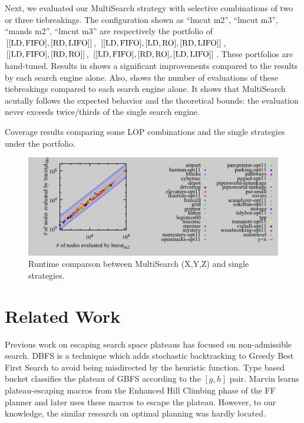 Next, we evaluated our MultiSearch
strategy with selective combinations of two or three tiebreakings.
The configuration shown as ``lmcut m2'', ``lmcut m3'', ``mands m2'',
``lmcut m3'' are respectively the portfolio of
$[[\mbox{LD},\mbox{FIFO}], [\mbox{RD},\mbox{LIFO}]]$, $[[\mbox{LD},\mbox{FIFO}], [\mbox{LD},\mbox{RO}], [\mbox{RD},\mbox{LIFO}]]$,
$[[\mbox{LD},\mbox{FIFO}],[\mbox{RD},\mbox{RO}]]$, $[[\mbox{LD},\mbox{FIFO}],[\mbox{RD},\mbox{RO}],[\mbox{LD},\mbox{LIFO}]]$. These
portfolios are hand-tuned.
Results in 
shows a significant improvements compared to the results by each search
engine alone.
% 
Also,  shows the number of evaluations of these
tiebreakings compared to each search engine alone.  It shows that
MultiSearch acutally follows the expected behavior and the theoretical
bounds: the evaluation never exceeds twice/thirds of the single
search engine.

\begin{table}[htb]
 \centering {}
 
 \caption{Coverage results comparing some LOP combinations and the
 single strategies under the portfolio. }
 \label{portfolio-coverage}
\end{table}

\begin{figure}[htb]
 \centering
 \includegraphics{tables/aaai16-5min/aaai16prelim3/evaluated-lmcut_m2-lmcut_ld_fifo.pdf}
 \caption{Runtime comparson between MultiSearch (X,Y,Z) and single strategies.}
 \label{portfolio-runtime}
\end{figure}


\section{Related Work}
\label{sec-4}

Previous work on escaping search space plateaus has focused on non-admissible search.
DBFS \cite{imai2011novel} is a technique which adds stochastic
backtracking to Greedy Best First Search to avoid being misdirected by the
heuristic function. Type based bucket \cite{xie14type} 
classifies the plateau of GBFS according to the $[g,h]$ pair.
Marvin \cite{Coles07} learns plateau-escaping macros from the Enhanced
Hill Climbing phase of the FF planner \cite{Hoffmann01} and later uses
these macros to escape the plateau.  However, to our knowledge, the
similar research on optimal planning was hardly located.

